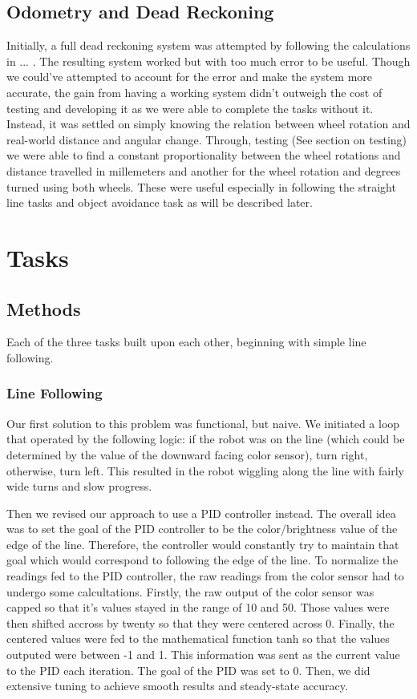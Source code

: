 \documentclass[12pt]{article}
\begin{document}
\subsection{Odometry and Dead Reckoning}
Initially, a full dead reckoning system was attempted by following the calculations in ... . The resulting system worked but with too much error to be useful. Though we could've attempted to account for the error and make the system more accurate, the gain from having a working system didn't outweigh the cost of testing and developing it as we were able to complete the tasks without it.
Instead, it was settled on simply knowing the relation between wheel rotation and real-world distance and angular change. Through, testing (See section on testing) we were able to find a constant proportionality between the wheel rotations and distance travelled in millemeters and another for the wheel rotation and degrees turned using both wheels. These were useful especially in following the straight line tasks and object avoidance task as will be described later. 


\section{Tasks}

\subsection{Methods}

Each of the three tasks built upon each other, beginning with simple line following.

\subsubsection{Line Following}

Our first solution to this problem was functional, but naive. We initiated a loop that operated by the following logic: if the robot was on the line (which could be determined by the value of the downward facing color sensor), turn right, otherwise, turn left. This resulted in the robot wiggling along the line with fairly wide turns and slow progress.

Then we revised our approach to use a PID controller instead. The overall idea was to set the goal of the PID controller to be the color/brightness value of the edge of the line. Therefore, the controller would constantly try to maintain that goal which would correspond to following the edge of the line. To normalize the readings fed to the PID controller, the raw readings from the color sensor had to undergo some calcultations. Firstly, the raw output of the color sensor was capped so that it's values stayed in the range of 10 and 50. Those values were then shifted accross by twenty so that they were centered across 0. Finally, the centered values were fed to the mathematical function tanh so that the values outputed were between -1 and 1. This information was sent as the current value to the PID each iteration. The goal of the PID was set to 0. Then, we did extensive tuning to achieve smooth results and steady-state accuracy.
\end{document}

